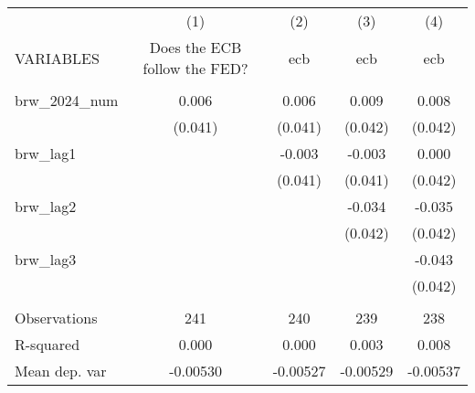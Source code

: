 \documentclass[]{article}
\begin{document}
\begin{tabular}{lcccc} \hline
 & (1) & (2) & (3) & (4) \\
VARIABLES & Does the ECB follow the FED? & ecb & ecb & ecb \\ \hline
 &  &  &  &  \\
brw\_2024\_num & 0.006 & 0.006 & 0.009 & 0.008 \\
 & (0.041) & (0.041) & (0.042) & (0.042) \\
brw\_lag1 &  & -0.003 & -0.003 & 0.000 \\
 &  & (0.041) & (0.041) & (0.042) \\
brw\_lag2 &  &  & -0.034 & -0.035 \\
 &  &  & (0.042) & (0.042) \\
brw\_lag3 &  &  &  & -0.043 \\
 &  &  &  & (0.042) \\
 &  &  &  &  \\
Observations & 241 & 240 & 239 & 238 \\
R-squared & 0.000 & 0.000 & 0.003 & 0.008 \\
 Mean dep. var & -0.00530 & -0.00527 & -0.00529 & -0.00537 \\ \hline
\end{tabular}
\end{document}
